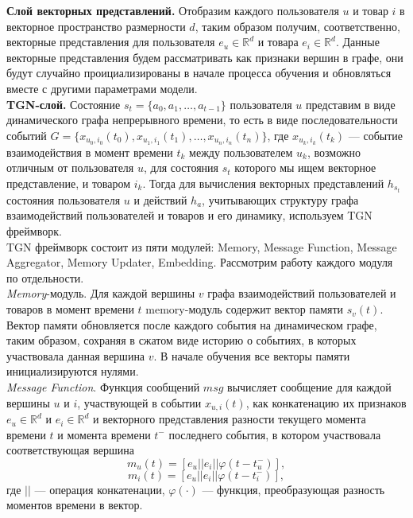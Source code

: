 \documentclass{mipt-thesis-ms}
\renewcommand{\phi}{\varphi}  %
\begin{document}
{\bf Слой векторных представлений.} Отобразим каждого пользователя $u$ и товар $i$ в векторное пространство размерности $d$, таким образом получим, соответственно, векторные представления для пользователя $e_u \in \mathbb{R}^d$ и товара $e_i \in \mathbb{R}^d$. Данные векторные представления будем рассматривать как признаки вершин в графе, они будут случайно проициализированы в начале процесса обучения и обновляться вместе с другими параметрами модели.\\

{\bf TGN-слой.} Состояние $s_t = \{a_0, a_1, \dots, a_{t-1}\}$ пользователя $u$ представим в виде динамического графа непрерывного времени, то есть в виде последовательности событий $G = \{x_{u_0, i_0}(t_0), x_{u_1, i_1}(t_1), \dots, x_{u_n, i_n}(t_n)\}$, где $x_{u_k, i_k}(t_{k})$ --- событие взаимодействия в момент времени $t_k$ между пользователем $u_k$, возможно отличным от пользователя $u$, для состояния $s_t$ которого мы ищем векторное представление, и товаром $i_k$. Тогда для вычисления векторных представлений $h_{s_t}$ состояния пользователя $u$ и действий $h_a$, учитывающих структуру графа взаимодействий пользователей и товаров и его динамику, используем TGN фреймворк.\\

TGN фреймворк состоит из пяти модулей: Memory, Message Function, Message Aggregator, Memory Updater, Embedding. Рассмотрим работу каждого модуля по отдельности.\\

{\it Memory}-модуль. Для каждой вершины $v$ графа взаимодействий пользователей и товаров в момент времени $t$ memory-модуль содержит вектор памяти $s_{v}(t)$. Вектор памяти обновляется после каждого события на динамическом графе, таким образом, сохраняя в сжатом виде историю о событиях, в которых участвовала данная вершина $v$. В начале обучения все векторы памяти инициализируются нулями.\\

{\it Message Function}. Функция сообщений ${msg}$ вычисляет сообщение для каждой вершины $u$ и $i$, участвующей в событии $x_{u, i}(t)$, как конкатенацию их признаков $e_u \in \mathbb{R}^d$ и $e_i \in \mathbb{R}^d$ и векторного представления разности текущего момента времени $t$ и момента времени $t^-$ последнего события, в котором участвовала соответствующая вершина 
$$m_u(t) = [e_u || e_i || \phi(t - t^-_u)],$$
$$m_i(t) = [e_u || e_i || \phi(t - t^-_i)],$$
где $||$ --- операция конкатенации, $\phi(\cdot)$ --- функция, преобразующая разность моментов времени в вектор.\\
\end{document}

